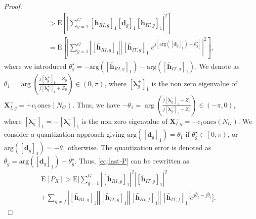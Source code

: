 \documentclass[twocolumn,10pt]{IEEEtran}
\begin{document}
\begin{proof}
\begin{align}
& >\text{E}\left[\left|\sum_{g=1}^{G}\left[\bar{\mathbf{h}}_{RI,g}\right]_1\left[\mathbf{d}_g\right]_1\left[\bar{\mathbf{h}}_{IT,g}\right]_1\right|^2\right]\\
& =\text{E}\left[\left|\sum_{g=1}^{G}\left|\left[\bar{\mathbf{h}}_{RI,g}\right]_1\right|\left|\left[\bar{\mathbf{h}}_{IT,g}\right]_1\right|e^{j\left[\text{arg}\left(\left[\mathbf{d}_g\right]_1\right)-\theta_g^\star\right]}\right|^2\right],\label{eq:last-P}
\end{align}
where we introduced $\theta_g^\star=-\text{arg}\left([\bar{\mathbf{h}}_{RI,g}]_1\right)-\text{arg}\left([\bar{\mathbf{h}}_{IT,g}]_1\right)$.
We denote as $\theta_1=\arg\left(\frac{j[\boldsymbol{\lambda}_g^+]_1-Z_{0}}{j[\boldsymbol{\lambda}_g^+]_1+Z_{0}}\right)\in\left(0,\pi\right)$, where $[\boldsymbol{\lambda}_g^+]_1$ is the non zero eigenvalue of $\mathbf{X}_{I,g}^+=+c_1\text{ones}\left(N_G\right)$.
Thus, we have $-\theta_1=\arg\left(\frac{j[\boldsymbol{\lambda}_g^-]_1-Z_{0}}{j[\boldsymbol{\lambda}_g^-]_1+Z_{0}}\right)\in\left(-\pi,0\right)$, where $[\boldsymbol{\lambda}_g^-]_1=-[\boldsymbol{\lambda}_g^+]_1$ is the non zero eigenvalue of $\mathbf{X}_{I,g}^-=-c_1\text{ones}\left(N_G\right)$.
We consider a quantization approach giving $\text{arg}\left([\mathbf{d}_g]_1\right)=\theta_1$ if $\theta_g^\star\in\left[0,\pi\right)$, or $\text{arg}\left([\mathbf{d}_g]_1\right)=-\theta_1$ otherwise.
The quantization error is denoted as $\bar{\theta}_g=\text{arg}\left([\mathbf{d}_g]_1\right)-\theta_g^\star$.
Thus, \eqref{eq:last-P} can be rewritten as
\begin{multline}
\text{E}\left[P_{R}\right]
>\text{E}\Bigg[\sum_{g=1}^{G}\left|\left[\bar{\mathbf{h}}_{RI,g}\right]_1\right|^2\left|\left[\bar{\mathbf{h}}_{IT,g}\right]_1\right|^2\\
+\sum_{g\neq f}\left|\left[\bar{\mathbf{h}}_{RI,g}\right]_1\right|\left|\left[\bar{\mathbf{h}}_{IT,g}\right]_1\right|\left|\left[\bar{\mathbf{h}}_{RI,f}\right]_1\right|\left|\left[\bar{\mathbf{h}}_{IT,f}\right]_1\right|e^{j\bar{\theta}_g-j\bar{\theta}_f}\Bigg].

\end{multline}
\end{proof}
\end{document}
